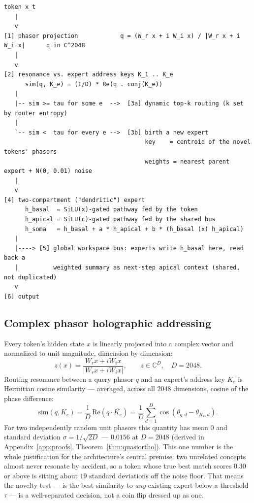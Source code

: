 \documentclass[11pt,letterpaper]{article}
\begin{document}
\begin{verbatim}
token x_t
   |
   v
[1] phasor projection            q = (W_r x + i W_i x) / |W_r x + i W_i x|      q in C^2048
   |
   v
[2] resonance vs. expert address keys K_1 .. K_e
      sim(q, K_e) = (1/D) * Re(q . conj(K_e))
   |
   |-- sim >= tau for some e  -->  [3a] dynamic top-k routing (k set by router entropy)
   |
   `-- sim <  tau for every e -->  [3b] birth a new expert
                                        key    = centroid of the novel tokens' phasors
                                        weights = nearest parent expert + N(0, 0.01) noise
   |
   v
[4] two-compartment ("dendritic") expert
      h_basal  = SiLU(x)-gated pathway fed by the token
      h_apical = SiLU(c)-gated pathway fed by the shared bus
      h_soma   = h_basal + a * h_apical + b * (h_basal (x) h_apical)
   |
   |----> [5] global workspace bus: experts write h_basal here, read back a
   |          weighted summary as next-step apical context (shared, not duplicated)
   v
[6] output
\end{verbatim}

\subsection{Complex phasor holographic addressing}

Every token's hidden state $x$ is linearly projected into a complex vector and normalized to unit magnitude, dimension by dimension:
\begin{equation}
z(x) = \frac{W_r x + i W_i x}{|W_r x + i W_i x|}, \qquad z \in \mathbb{C}^D, \quad D = 2048.
\end{equation}
Routing resonance between a query phasor $q$ and an expert's address key $K_e$ is Hermitian cosine similarity --- averaged, across all 2048 dimensions, cosine of the phase difference:
\begin{equation}
\mathrm{sim}(q, K_e) = \frac{1}{D}\,\mathrm{Re}\!\left(q \cdot \overline{K_e}\right) = \frac{1}{D}\sum_{d=1}^{D} \cos(\theta_{q,d} - \theta_{K_e,d}).
\end{equation}
For two independently random unit phasors this quantity has mean $0$ and standard deviation $\sigma = 1/\sqrt{2D}$ --- $\mathbf{0.0156}$ at $D=2048$ (derived in Appendix~\ref{app:proofs}, Theorem~\ref{thm:quasiortho}). This one number is the whole justification for the architecture's central premise: two unrelated concepts almost never resonate by accident, so a token whose true best match scores $0.30$ or above is sitting about $19$ standard deviations off the noise floor. That means the novelty test --- is the best similarity to \emph{any} existing expert below a threshold $\tau$ --- is a well-separated decision, not a coin flip dressed up as one.
\end{document}
